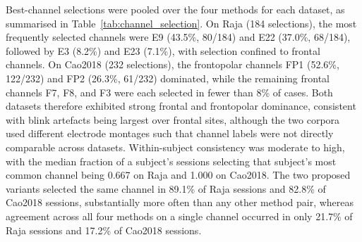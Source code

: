 Best-channel selections were pooled over the four methods for each dataset, as summarised in Table~\ref{tab:channel_selection}. On Raja (184 selections), the most frequently selected channels were E9 (43.5\%, 80/184) and E22 (37.0\%, 68/184), followed by E3 (8.2\%) and E23 (7.1\%), with selection confined to frontal channels. On Cao2018 (232 selections), the frontopolar channels FP1 (52.6\%, 122/232) and FP2 (26.3\%, 61/232) dominated, while the remaining frontal channels F7, F8, and F3 were each selected in fewer than 8\% of cases. Both datasets therefore exhibited strong frontal and frontopolar dominance, consistent with blink artefacts being largest over frontal sites, although the two corpora used different electrode montages such that channel labels were not directly comparable across datasets. Within-subject consistency was moderate to high, with the median fraction of a subject's sessions selecting that subject's most common channel being 0.667 on Raja and 1.000 on Cao2018. The two proposed variants selected the same channel in 89.1\% of Raja sessions and 82.8\% of Cao2018 sessions, substantially more often than any other method pair, whereas agreement across all four methods on a single channel occurred in only 21.7\% of Raja sessions and 17.2\% of Cao2018 sessions.
